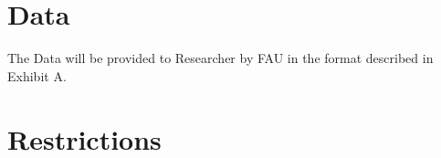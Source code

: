 \documentclass[11pt]{article}
\begin{document}
\begin{Form}
  
  \section{Data}
  \label{sec:data}

  The Data will be provided to Researcher by FAU in the format described in Exhibit A.


%  
% 


  \section{Restrictions}
  \label{sec:restrictions}


\end{Form}
\end{document}
